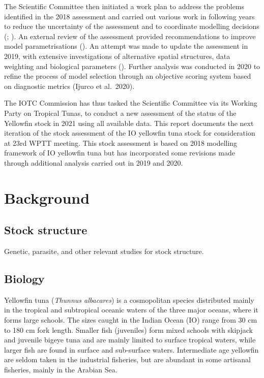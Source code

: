 \documentclass[
]{scrartcl}
\begin{document}
The Scientific Committee then initiated a work plan to address the
problems identified in the 2018 assessment and carried out various work
in following years to reduce the uncertainty of the assessment and to
coordinate modelling decisions
(;
). An external
review of the assessment provided recommendations to improve model
parametrisations
(). An attempt was made to update the assessment in 2019, with
extensive investigations of alternative spatial structures, data
weighting and biological parameters
(). Further analysis was conducted in 2020 to refine the process
of model selection through an objective scoring system based on
diagnostic metrics (Ijurco et al.~2020).

The IOTC Commission has thus tasked the Scientific Committee via its
Working Party on Tropical Tunas, to conduct a new assessment of the
status of the Yellowfin stock in 2021 using all available data. This
report documents the next iteration of the stock assessment of the IO
yellowfin tuna stock for consideration at 23rd WPTT meeting. This stock
assessment is based on 2018 modelling framework of IO yellowfin tuna but
has incorporated some revisions made through additional analysis carried
out in 2019 and 2020.

\section{Background}\label{background}

\subsection{Stock structure}\label{stock-structure}

Genetic, parasite, and other relevant studies for stock structure.

\subsection{Biology}\label{biology}

Yellowfin tuna (\emph{Thunnus albacares}) is a cosmopolitan species
distributed mainly in the tropical and subtropical oceanic waters of the
three major oceans, where it forms large schools. The sizes caught in
the Indian Ocean (IO) range from 30 cm to 180 cm fork length. Smaller
fish (juveniles) form mixed schools with skipjack and juvenile bigeye
tuna and are mainly limited to surface tropical waters, while larger
fish are found in surface and sub-surface waters. Intermediate age
yellowfin are seldom taken in the industrial fisheries, but are abundant
in some artisanal fisheries, mainly in the Arabian Sea.
\end{document}
